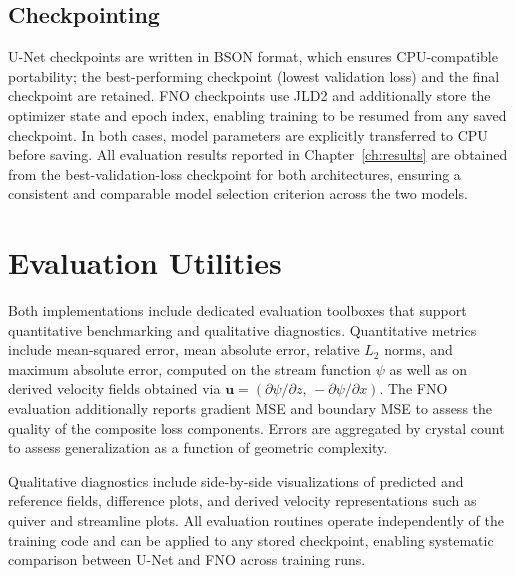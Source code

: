 \subsection*{Checkpointing}

U-Net checkpoints are written in BSON format, which ensures CPU-compatible portability; the best-performing checkpoint (lowest validation loss) and the final checkpoint are retained. FNO checkpoints use JLD2 and additionally store the optimizer state and epoch index, enabling training to be resumed from any saved checkpoint. In both cases, model parameters are explicitly transferred to CPU before saving. All evaluation results reported in Chapter~\ref{ch:results} are obtained from the best-validation-loss checkpoint for both architectures, ensuring a consistent and comparable model selection criterion across the two models.

\section{Evaluation Utilities}

Both implementations include dedicated evaluation toolboxes that support quantitative benchmarking and qualitative diagnostics. Quantitative metrics include mean-squared error, mean absolute error, relative $L_2$ norms, and
maximum absolute error, computed on the stream function $\psi$ as well as on derived velocity fields obtained via $\mathbf{u} = (\partial\psi/\partial z,\, -\partial\psi/\partial x)$. The FNO evaluation additionally reports gradient MSE and boundary MSE to assess the quality of the composite loss components. Errors are aggregated by crystal count to assess generalization as a function of geometric complexity.

Qualitative diagnostics include side-by-side visualizations of predicted and reference fields, difference plots, and derived velocity representations such as quiver and streamline plots. All evaluation routines operate independently of the training code and can be applied to any stored checkpoint, enabling systematic comparison between U-Net and FNO across training runs.

